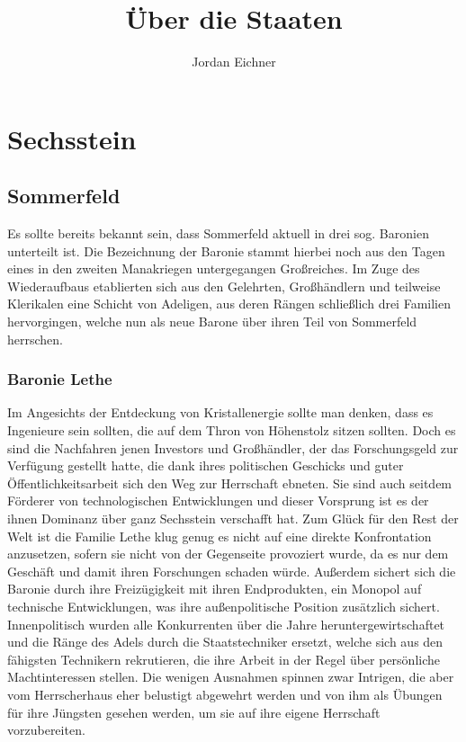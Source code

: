\documentclass[a4paper,12pt,oneside]{book}
\title{Über die Staaten}
\author{Jordan Eichner}
\date{}
\begin{document}
\maketitle
\tableofcontents

\part{Sechsstein}

\chapter{Sommerfeld}
Es sollte bereits bekannt sein, dass Sommerfeld aktuell in drei sog. Baronien unterteilt ist. Die Bezeichnung der Baronie stammt hierbei noch aus den Tagen eines in den zweiten Manakriegen untergegangen Großreiches. Im Zuge des Wiederaufbaus etablierten sich aus den Gelehrten, Großhändlern und teilweise Klerikalen eine Schicht von Adeligen, aus deren Rängen schließlich drei Familien hervorgingen, welche nun als neue Barone über ihren Teil von Sommerfeld herrschen.

\section{Baronie Lethe}
Im Angesichts der Entdeckung von Kristallenergie sollte man denken, dass es Ingenieure sein sollten, die auf dem Thron von Höhenstolz sitzen sollten. Doch es sind die Nachfahren jenen Investors und Großhändler, der das Forschungsgeld zur Verfügung gestellt hatte, die dank ihres politischen Geschicks und guter Öffentlichkeitsarbeit sich den Weg zur Herrschaft ebneten. Sie sind auch seitdem Förderer von technologischen Entwicklungen und dieser Vorsprung ist es der ihnen Dominanz über ganz Sechsstein verschafft hat. Zum Glück für den Rest der Welt ist die Familie Lethe klug genug es nicht auf eine direkte Konfrontation anzusetzen, sofern sie nicht von der Gegenseite provoziert wurde, da es nur dem Geschäft und damit ihren Forschungen schaden würde. Außerdem sichert sich die Baronie durch ihre Freizügigkeit mit ihren Endprodukten, ein Monopol auf technische Entwicklungen, was ihre außenpolitische Position zusätzlich sichert. Innenpolitisch wurden alle Konkurrenten über die Jahre heruntergewirtschaftet und die Ränge des Adels durch die Staatstechniker ersetzt, welche sich aus den fähigsten Technikern rekrutieren, die ihre Arbeit in der Regel über persönliche Machtinteressen stellen. Die wenigen Ausnahmen spinnen zwar Intrigen, die aber vom Herrscherhaus eher belustigt abgewehrt werden und von ihm als Übungen für ihre Jüngsten gesehen werden, um sie auf ihre eigene Herrschaft vorzubereiten.
\end{document}
